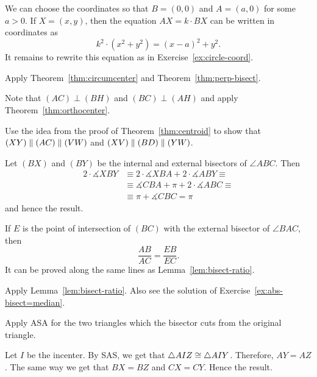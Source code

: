 We can choose the coordinates so that $B=(0,0)$ and $A=(a,0)$ for some $a>0$.
If $X=(x,y)$, then the equation $AX=k\cdot BX$ can be written in coordinates as 
\[k^2\cdot(x^2+y^2)=(x-a)^2+y^2.\]
It remains to rewrite this equation as in Exercise~\ref{ex:circle-coord}.


\setcounter{eqtn}{0}

Apply Theorem~\ref{thm:circumcenter} and Theorem~\ref{thm:perp-bisect}.

Note that $(AC)\perp (BH)$ and $(BC)\perp (AH)$ and apply Theorem~\ref{thm:orthocenter}.

Use the idea from the proof of Theorem~\ref{thm:centroid}
to show that $(XY)\parallel (AC)\z\parallel (VW)$ and
$(XV)\parallel (BD)\z\parallel (YW)$.

Let $(BX)$ and $(BY)$ be the internal and external bisectors of $\angle ABC$.
Then 
\begin{align*}
2\cdot \measuredangle XBY&\equiv2\cdot \measuredangle XBA+2\cdot \measuredangle ABY\equiv
\\
&\equiv\measuredangle CBA+\pi+2\cdot \measuredangle ABC\equiv
\\
&\equiv \pi+\measuredangle CBC=\pi
\end{align*}
and hence the result.

If $E$ is the point of intersection of $(BC)$ 
with the external bisector of $\angle BAC$, then 
$$\frac{AB}{AC}=\frac{EB}{EC}.$$
It can be proved along the same lines as Lemma~\ref{lem:bisect-ratio}.

Apply Lemma~\ref{lem:bisect-ratio}.
Also see the solution of Exercise~\ref{ex:abs-bisect=median}.

Apply ASA for the two triangles which the bisector cuts from the original triangle. 

Let $I$ be the incenter.
By SAS, we get that $\triangle AIZ\z\cong\triangle AIY$.
Therefore, $AY=AZ$.
The same way we get that $BX=BZ$ and $CX=CY$.
Hence the result.

